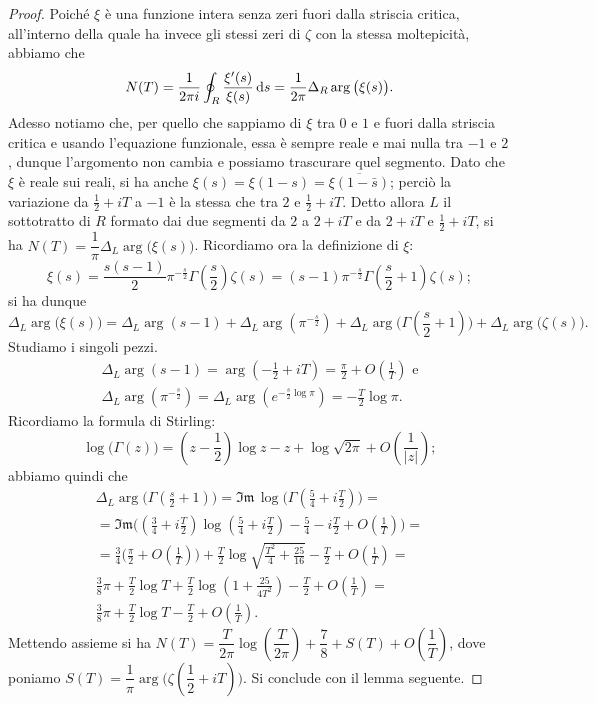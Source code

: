 \begin{proof}
  Poiché $\xi$ è una funzione intera senza zeri fuori dalla striscia critica, all'interno della quale ha invece gli stessi zeri di $\zeta$ con la stessa moltepicità, abbiamo che
  $$N(T)=\frac{1}{2\pi i} \oint_R \frac{\xi'(s)}{\xi(s)}\mathop{}\!\mathrm{d} s=\frac{1}{2\pi}\Delta_R \arg\big(\xi(s)\big).$$
  Adesso notiamo che, per quello che sappiamo di $\xi$ tra $0$ e $1$ e fuori dalla striscia critica e usando l'equazione funzionale, essa è sempre reale e mai nulla tra $-1$ e $2$, dunque l'argomento non cambia e possiamo trascurare quel segmento. Dato che $\xi$ è reale sui reali, si ha anche $\xi(s)=\xi(1-s)=\overline{\xi(1-\bar{s})}$; perciò la variazione da $\frac{1}{2}+iT$ a $-1$ è la stessa che tra $2$ e $\frac{1}{2}+iT$.
  Detto allora $L$ il sottotratto di $R$ formato dai due segmenti da $2$ a $2+iT$ e da $2+iT$ e $\frac{1}{2}+iT$, si ha $N(T)=\dfrac{1}{\pi}\Delta_L \arg\big(\xi(s)\big)$. Ricordiamo ora la definizione di $\xi$:
  $$\xi(s)=\frac{s(s-1)}{2}\pi^{-\frac{s}{2}}\Gamma\left(\frac{s}{2}\right)\zeta(s)=(s-1)\pi^{-\frac{s}{2}}\Gamma\left(\frac{s}{2}+1\right)\zeta(s);$$
  si ha dunque
  $$\Delta_L\arg\big(\xi(s)\big)=\Delta_L\arg(s-1)+\Delta_L\arg\left(\pi^{-\frac{s}{2}}\right)+\Delta_L\arg\Bigg(\Gamma\left(\frac{s}{2}+1\right)\Bigg)+\Delta_L\arg\big(\zeta(s)\big).$$
  Studiamo i singoli pezzi.
  \begin{gather*}
    \Delta_L\arg(s-1)=\arg\left(-\frac{1}{2}+iT\right)=\frac{\pi}{2}+O\left(\frac{1}{T}\right) \text{ e}\\
    \Delta_L\arg\left(\pi^{-\frac{s}{2}}\right)=\Delta_L\arg\left(e^{-\frac{s}{2}\log{\pi}}\right)=-\frac{T}{2}\log{\pi}.
  \end{gather*}
  Ricordiamo la formula di Stirling:
  $$\log\big(\Gamma(z)\big)=\left(z-\frac{1}{2}\right)\log{z}-z+\log{\sqrt{2\pi}}+O\left(\frac{1}{|z|}\right);$$
  abbiamo quindi che
  \begin{gather*}
    \Delta_L\arg\Bigg(\Gamma\left(\frac{s}{2}+1\right)\Bigg)=\mathfrak{Im}\,\log\Bigg(\Gamma\left(\frac{5}{4}+i\frac{T}{2}\right)\Bigg)= \\
    =\mathfrak{Im}\Bigg(\left(\frac{3}{4}+i\frac{T}{2}\right)\log\left(\frac{5}{4}+i\frac{T}{2}\right)-\frac{5}{4}-i\frac{T}{2}+O\left(\frac{1}{T}\right)\Bigg)= \\
    =\frac{3}{4}\Bigg(\frac{\pi}{2}+O\left(\frac{1}{T}\right)\Bigg)+\frac{T}{2}\log\sqrt{\frac{T^2}{4}+\frac{25}{16}}-\frac{T}{2}+O\left(\frac{1}{T}\right)=\\
    \frac{3}{8}\pi+\frac{T}{2}\log{T}+\frac{T}{2}\log\left(1+\frac{25}{4T^2}\right)-\frac{T}{2}+O\left(\frac{1}{T}\right)=\\
    \frac{3}{8}\pi+\frac{T}{2}\log{T}-\frac{T}{2}+O\left(\frac{1}{T}\right).
  \end{gather*}
  Mettendo assieme si ha $N(T)=\dfrac{T}{2\pi}\log\left(\dfrac{T}{2\pi}\right)+\dfrac{7}{8}+S(T)+O\left(\dfrac{1}{T}\right)$, dove poniamo $S(T)=\dfrac{1}{\pi}\arg\Bigg(\zeta\left(\dfrac{1}{2}+iT\right)\Bigg)$. Si conclude con il lemma seguente.
\end{proof}


